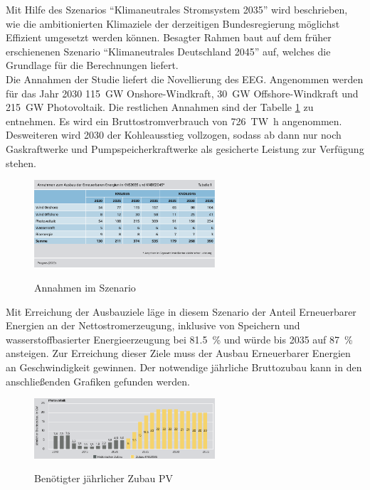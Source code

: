 		Mit Hilfe des Szenarios "`Klimaneutrales Stromsystem 2035"' wird beschrieben, wie die ambitionierten Klimaziele der derzeitigen Bundesregierung möglichst Effizient umgesetzt werden können. Besagter Rahmen baut auf dem früher erschienenen Szenario "`Klimaneutrales Deutschland 2045"' auf, welches die Grundlage für die Berechnungen liefert.\\
		Die Annahmen der Studie liefert die Novellierung des EEG. Angenommen werden für das Jahr 2030 \SI{115}{\giga \watt} Onshore-Windkraft, \SI{30}{\giga \watt} Offshore-Windkraft und \SI{215}{\giga \watt} Photovoltaik.\cite[S.22]{Agora_KlimaneutralesStromsystem} Die restlichen Annahmen sind der Tabelle \ref{Abb. Annahmen Agora2035} zu entnehmen.	Es wird ein Bruttostromverbrauch von \SI{726}{\tera \watt \hour} angenommen.\cite[S.33]{Agora_KlimaneutralesStromsystem} Desweiteren wird 2030 der Kohleausstieg vollzogen, sodass ab dann nur noch Gaskraftwerke und Pumpspeicherkraftwerke als gesicherte Leistung zur Verfügung stehen.\cite[S.31]{Agora_KlimaneutralesStromsystem} \\
		
		\begin{figure}[H]
			\centering
			\includegraphics[page=1, width=0.6\textwidth]{./anhang/Annahmen Agora2035.png}
			\caption{Annahmen im Szenario}
			\label{Abb. Annahmen Agora2035} \cite[S.22]{Agora_KlimaneutralesStromsystem}
		\end{figure}
	
		Mit Erreichung der Ausbauziele läge in diesem Szenario der Anteil Erneuerbarer Energien an der Nettostromerzeugung, inklusive von Speichern und wasserstoffbasierter Energieerzeugung bei \SI{81,5}{\percent} und würde bis 2035 auf \SI{87}{\percent} ansteigen. \cite[S.23]{Agora_KlimaneutralesStromsystem} Zur Erreichung dieser Ziele muss der Ausbau Erneuerbarer Energien an Geschwindigkeit gewinnen. Der notwendige jährliche Bruttozubau kann in den anschließenden Grafiken gefunden werden. \\
			
			\begin{figure}[H]
				\centering
				\includegraphics[page=1, clip, width=0.6\textwidth]{./anhang/Zubau PV Agora2035.png}
				\caption{Benötigter jährlicher Zubau PV}
				\label{Abb.Zubau PV Agora2035} \cite[S.24]{Agora_KlimaneutralesStromsystem}
			\end{figure}
			
